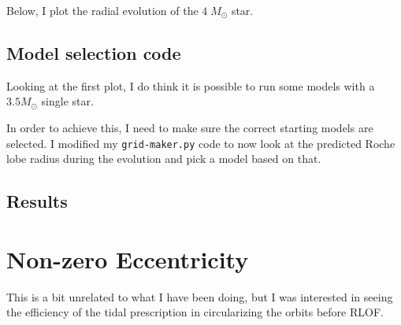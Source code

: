 \documentclass[a4paper,10pt]{article}
\begin{document}
Below, I plot the radial evolution of the \(4\;M_\odot \) star.

\begin{figure}[ht]
    \centering
\end{figure}


\subsection{Model selection code}
Looking at the first plot, I do think it is possible to run some models with a \(3.5M_\odot \) single star.

In order to achieve this, I need to make sure the correct starting models are selected. I modified my \lstinline[style=output, breaklines=true]|grid-maker.py| code to now look at the predicted Roche lobe radius during the evolution and pick a model based on that.
\subsection{Results}

\begin{figure}[ht]
    \centering
\end{figure}
\begin{figure}[ht]
    \centering
\end{figure}


\section{Non-zero Eccentricity}

This is a bit unrelated to what I have been doing, but I was interested in seeing the efficiency of the \citet{hut1981} tidal prescription in circularizing the orbits before RLOF.
\end{document}
